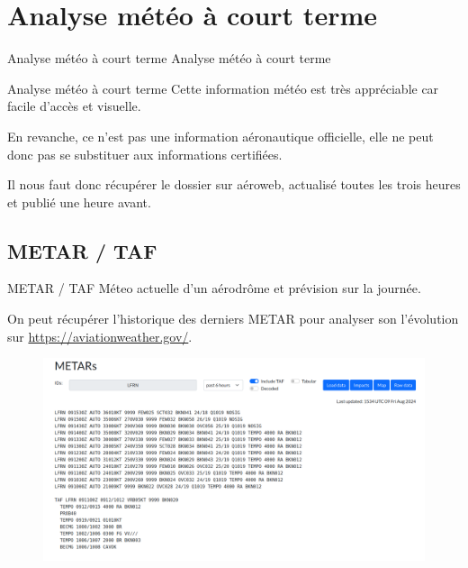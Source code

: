 \documentclass{beamer}
\begin{document}
\section{Analyse météo à court terme}
\begin{frame}{Analyse météo à court terme}
  \LARGE{Analyse météo à court terme}
\end{frame}

\begin{frame}{Analyse météo à court terme}
  Cette information météo est très appréciable car facile d'accès et visuelle.

  En revanche, ce n'est pas une information aéronautique officielle,
  elle ne peut donc pas se substituer aux informations certifiées.

  Il nous faut donc récupérer le dossier sur aéroweb, actualisé toutes
  les trois heures et publié une heure avant.
\end{frame}

\subsection{METAR / TAF}
\begin{frame}{METAR / TAF}
  Méteo actuelle d'un aérodrôme et prévision sur la journée.
  \pause

  On peut récupérer l'historique des derniers METAR pour analyser
  son l'évolution sur \url{https://aviationweather.gov/}.
  \pause
  \begin{figure}
    \centering
    \includegraphics[scale=0.7]{images/aviation-weather.gov.png}
  \end{figure}
\end{frame}
\end{document}

